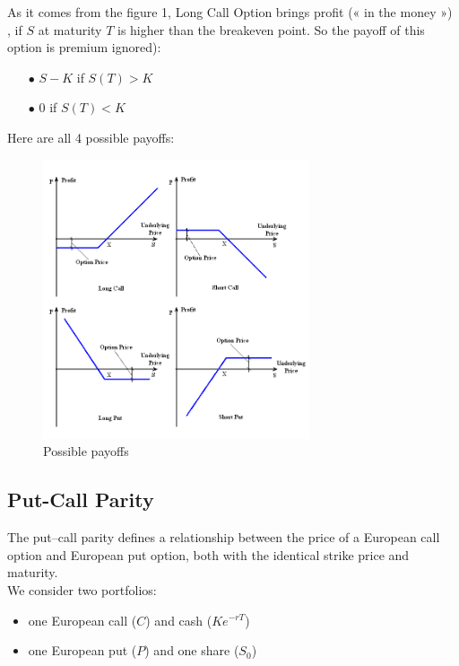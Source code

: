 \documentclass[a4paper]{report}
\begin{document}
\begin{itemize}
As it comes from the figure 1,  Long Call Option brings profit (« in the money ») , if $S$ at maturity $T$ is higher than the breakeven point. So the payoff of this option is premium ignored):
\begin{itemize}
\item[$\bullet$]  $S - K$ if $S(T)>K$\\
\item[$\bullet$]  $0$ if $S(T)<K$\\
\end{itemize}
Here are all 4 possible payoffs:
\begin{figure}[H]
    \centering
    \includegraphics[width=0.7\textwidth]{OptionsProfit.png}
    \caption{Possible payoffs}

\end{figure}




\subsection{Put-Call Parity}

The put–call parity defines a relationship between the price of a European call option and European put option, both with the identical strike price and maturity.\\
We consider two portfolios:

\begin{itemize}
\item {one European call ($C$) and cash ($Ke^{-rT}$)}
\item {one European put ($P$) and one share ($S_0$)}
\end{itemize}


\end{itemize}
\end{document}
